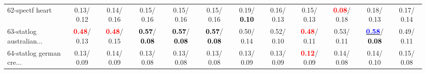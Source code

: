 \begin{table}[h]
\begin{center}
{\begin{tabular}{lc|c|c|c|c|c|c|c|c|c|c}
62-spectf heart &   0.13/  0.12 &   0.14/  0.16 &   0.15/  0.16 &   0.15/  0.16 &   0.15/  0.16 &   0.19/\textcolor{black}{\textbf{  0.10}} &   0.16/  0.13 &   0.15/  0.13 & \textcolor{red}{\textbf{  0.08}}/  0.18 &   0.18/  0.13 &   0.17/  0.14 \\
63-statlog australian... & \textcolor{red}{\textbf{  0.48}}/  0.13 & \textcolor{red}{\textbf{  0.48}}/  0.15 & \textcolor{black}{\textbf{  0.57}}/\textcolor{black}{\textbf{  0.08}} & \textcolor{black}{\textbf{  0.57}}/\textcolor{black}{\textbf{  0.08}} & \textcolor{black}{\textbf{  0.57}}/\textcolor{black}{\textbf{  0.08}} &   0.50/  0.14 &   0.52/  0.10 & \textcolor{red}{\textbf{  0.48}}/  0.11 &   0.53/  0.11 & \underline{\textcolor{blue}{\textbf{  0.58}}}/\textcolor{black}{\textbf{  0.08}} &   0.49/  0.11 \\
64-statlog german cre... &   0.13/  0.09 &   0.14/  0.09 &   0.13/  0.08 &   0.13/  0.08 &   0.13/  0.08 &   0.13/  0.09 &   0.13/  0.09 & \textcolor{red}{\textbf{  0.12}}/  0.09 &   0.14/  0.08 &   0.14/  0.10 &   0.15/  0.08 \\\end{tabular}}\label{stratsALCKappa1aIELM}
\end{center}
\end{table}
